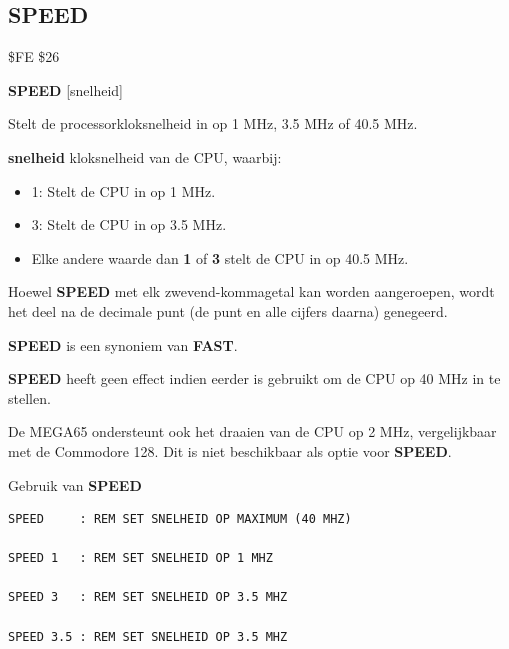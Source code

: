 \subsection{SPEED}
\begin{description}[leftmargin=2cm,style=nextline]
\item [Token:]    \$FE \$26

\item [Formaat:]   {\bf SPEED} [snelheid]

\item [Gebruik:]    Stelt de processorkloksnelheid in op 1 MHz, 3.5 MHz of 40.5 MHz.

                  {\bf snelheid} kloksnelheid van de CPU, waarbij:
                  \begin{itemize}
                     \item 1: Stelt de CPU in op 1 MHz.                     \item 3: Stelt de CPU in op 3.5 MHz.                     \item Elke andere waarde dan {\bf 1} of {\bf 3} stelt de CPU in op 40.5 MHz.
                  \end{itemize}

\item [Opmerkingen:]  Hoewel {\bf SPEED} met elk zwevend-kommagetal kan worden aangeroepen, wordt het deel na de decimale punt (de punt en alle cijfers daarna) genegeerd.

                  {\bf SPEED} is een synoniem van {\bf FAST}.

                  {\bf SPEED} heeft geen effect indien  eerder is gebruikt om de CPU op 40 MHz in te stellen.

                  De MEGA65 ondersteunt ook het draaien van de CPU op 2 MHz, vergelijkbaar met de Commodore 128. Dit is niet beschikbaar als optie voor {\bf SPEED}.

\item [Voorbeelden:] Gebruik van {\bf SPEED}

\begin{tcolorbox}[colback=black,coltext=white]
\verbatimfont{\codefont}
\begin{verbatim}
SPEED     : REM SET SNELHEID OP MAXIMUM (40 MHZ)

SPEED 1   : REM SET SNELHEID OP 1 MHZ

SPEED 3   : REM SET SNELHEID OP 3.5 MHZ

SPEED 3.5 : REM SET SNELHEID OP 3.5 MHZ
\end{verbatim}
\end{tcolorbox}
\end{description}


